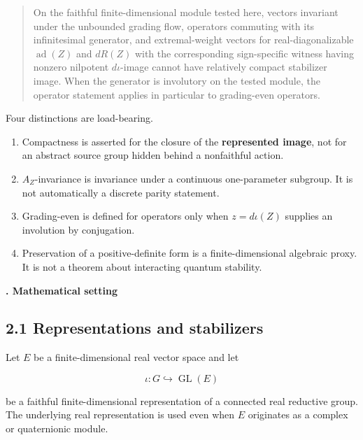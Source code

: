 \documentclass[
  10pt,
  letterpaper,
  oneside]{scrartcl}
\providecommand{\tightlist}{%
  \setlength{\itemsep}{0pt}\setlength{\parskip}{0pt}}
\begin{document}
\begin{quote}
On the faithful finite-dimensional module tested here, vectors invariant
under the unbounded grading flow, operators commuting with its
infinitesimal generator, and extremal-weight vectors for
real-diagonalizable \(\operatorname{ad}(Z)\) and \(dR(Z)\) with the
corresponding sign-specific witness having nonzero nilpotent
\(d\iota\)-image cannot have relatively compact stabilizer image. When
the generator is involutory on the tested module, the operator statement
applies in particular to grading-even operators.
\end{quote}

Four distinctions are load-bearing.

\begin{enumerate}
\def\labelenumi{\arabic{enumi}.}
\tightlist
\item
  Compactness is asserted for the closure of the \textbf{represented
  image}, not for an abstract source group hidden behind a nonfaithful
  action.
\item
  \(A_Z\)-invariance is invariance under a continuous one-parameter
  subgroup. It is not automatically a discrete parity statement.
\item
  Grading-even is defined for operators only when \(z=d\iota(Z)\)
  supplies an involution by conjugation.
\item
  Preservation of a positive-definite form is a finite-dimensional
  algebraic proxy. It is not a theorem about interacting quantum
  stability.
\end{enumerate}

\par\vspace{1.1em}
{\Large\bfseries{}. Mathematical setting\par}\label{mathematical-setting}
\vspace{0.55em}

\subsection{2.1 Representations and
stabilizers}\label{representations-and-stabilizers}

Let \(E\) be a finite-dimensional real vector space and let

\[
\iota:G\hookrightarrow\operatorname{GL}(E)
\]

be a faithful finite-dimensional representation of a connected real
reductive group. The underlying real representation is used even when
\(E\) originates as a complex or quaternionic module.
\end{document}
